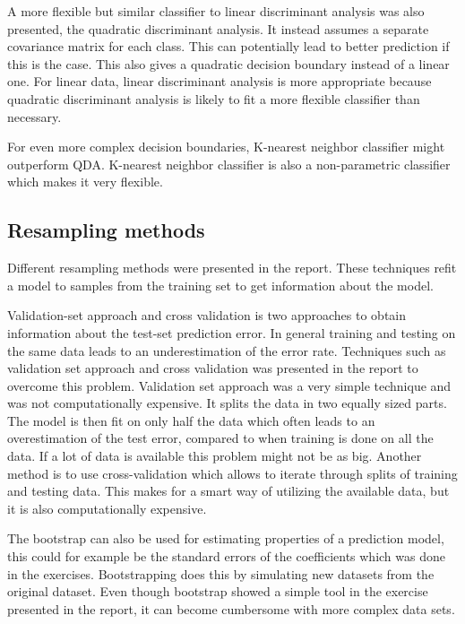 A more flexible but similar classifier to linear discriminant analysis was also presented, the quadratic discriminant analysis. It instead assumes a separate covariance matrix for each class. This can potentially lead to better prediction if this is the case. This also gives a quadratic decision boundary instead of a linear one. For linear data, linear discriminant analysis is more appropriate because quadratic discriminant analysis is likely to fit a more flexible classifier than necessary.

For even more complex decision boundaries, K-nearest neighbor classifier might outperform QDA. K-nearest neighbor classifier is also a non-parametric classifier which makes it very flexible.

\subsection{Resampling methods}
Different resampling methods were presented in the report. These techniques refit a model to samples from the training set to get information about the model. 

Validation-set approach and cross validation is two approaches to obtain information about the test-set prediction error. In general training and testing on the same data leads to an underestimation of the error rate. Techniques such as validation set approach and cross validation was presented in the report to overcome this problem. Validation set approach was a very simple technique and was not computationally expensive. It splits the data in two equally sized parts. The model is then fit on only half the data which often leads to an overestimation of the test error, compared to when training is done on all the data. If a lot of data is available this problem might not be as big. Another method is to use cross-validation which allows to iterate through splits of training and testing data. This makes for a smart way of utilizing the available data, but it is also computationally expensive.

The bootstrap can also be used for estimating properties of a prediction model, this could for example be the standard errors of the coefficients which was done in the exercises. Bootstrapping does this by simulating new datasets from the original dataset. Even though bootstrap showed a simple tool in the exercise presented in the report, it can become cumbersome with more complex data sets.

